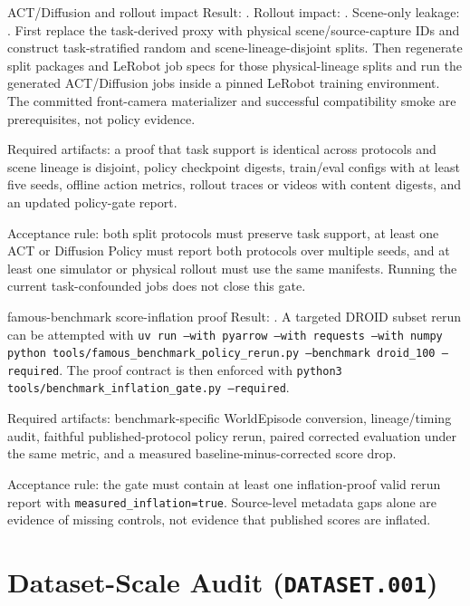 \begin{openresult}{ACT/Diffusion and rollout impact}
Result: \ExpActDiffusionResult. Rollout impact: \ExpRolloutImpactResult. Scene-only leakage:
\ExpSceneOnlyLeakageResult. First replace the task-derived proxy with physical
scene/source-capture IDs and construct task-stratified random and scene-lineage-disjoint splits.
Then regenerate split packages and LeRobot job specs for those physical-lineage splits and run the
generated ACT/Diffusion jobs inside a pinned LeRobot training environment. The committed
front-camera materializer and successful compatibility smoke are prerequisites, not policy evidence.

Required artifacts: a proof that task support is identical across protocols and scene lineage is
disjoint, policy checkpoint digests, train/eval configs with at least five seeds, offline action
metrics, rollout traces or videos with content digests, and an updated policy-gate report.

Acceptance rule: both split protocols must preserve task support, at least one ACT or Diffusion
Policy must report both protocols over multiple seeds, and at least one simulator or physical
rollout must use the same manifests. Running the current task-confounded jobs does not close this
gate.
\end{openresult}

\begin{openresult}{famous-benchmark score-inflation proof}
Result: \ExpBenchmarkInflationResult. A targeted DROID subset rerun can be attempted with
\texttt{uv run --with pyarrow --with requests --with numpy python
tools/famous\_benchmark\_policy\_rerun.py --benchmark droid\_100 --required}. The proof contract is
then enforced with \texttt{python3 tools/benchmark\_inflation\_gate.py --required}.

Required artifacts: benchmark-specific WorldEpisode conversion, lineage/timing audit, faithful
published-protocol policy rerun, paired corrected evaluation under the same metric, and a measured
baseline-minus-corrected score drop.

Acceptance rule: the gate must contain at least one inflation-proof valid rerun report with
\texttt{measured\_inflation=true}. Source-level metadata gaps alone are evidence of missing
controls, not evidence that published scores are inflated.
\end{openresult}

\section{Dataset-Scale Audit (\texttt{DATASET.001})}
\label{app:scale}

